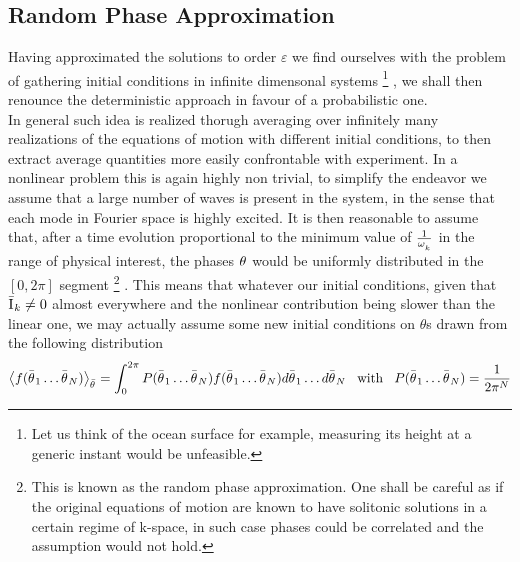 \subsection{Random Phase Approximation}

Having approximated the solutions to order $\varepsilon$ we find ourselves with the problem of gathering 
initial conditions in infinite dimensonal systems
\footnote{Let us think of the ocean surface for example, measuring its height at a generic instant would be unfeasible.}
, we shall then renounce the deterministic approach in favour of 
a probabilistic one.\\
In general such idea is realized thorugh averaging over infinitely many realizations of the equations of motion with different initial conditions, to then extract 
average quantities more easily confrontable with experiment. In a nonlinear problem this is again highly non trivial, to simplify the endeavor we assume that
a large number of waves is present in the system, in the sense that each mode in Fourier space is highly excited. It is then reasonable to assume that, after a time
evolution proportional to the minimum value of $\frac{1}{\omega^{}_k}$ in the range of physical interest, the phases $\theta^{}$ would be uniformly distributed in the $\left[0,2\pi\right]$ segment 
\footnote{This is known as the random phase approximation. One shall be careful as if the original equations of motion are known to have solitonic solutions in a certain regime of k-space, 
in such case phases could be correlated and the assumption would not hold.}
. This means that whatever our initial conditions, given that $\bar{\mathrm{I}^{}}_k \neq 0$ almost everywhere and the nonlinear contribution being slower than the linear one,
we may actually assume some new initial conditions on $\theta$s drawn from the following distribution
\begin{equation}
    \left\langle f(\bar{\theta^{}}_1 \dots \bar{\theta^{}}_N) \right\rangle_{\bar{\theta}^{}} = 
    \int_{0}^{2\pi} P(\bar{\theta^{}}_1 \dots \bar{\theta^{}}_N)f(\bar{\theta^{}}_1 \dots \bar{\theta^{}}_N) d\bar{\theta^{}}_1 \dots d\bar{\theta^{}}_N 
    \hspace{3mm} \text{with} \hspace{3mm}
    P(\bar{\theta^{}}_1 \dots \bar{\theta^{}}_N) = \frac{1}{2\pi^{N}}
\end{equation}

